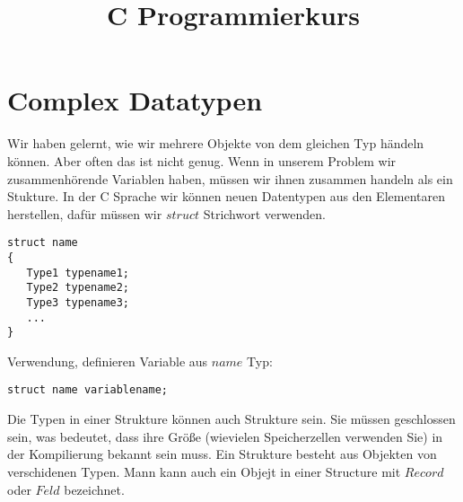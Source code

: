 \documentclass{article}[12pt]
\title{C Programmierkurs}
\newenvironment{myalertblock}[1]{%
    \tcolorbox[beamer,%
    noparskip,breakable,
    colback=White,colframe=Bittersweet,%
    colbacklower=Peach!75!White,%
    title=#1]}%
    {\endtcolorbox}
\begin{document}
\maketitle








\section{Complex Datatypen}
Wir haben gelernt, wie wir mehrere Objekte von dem gleichen Typ händeln
können. Aber often das ist nicht genug. Wenn in unserem Problem
wir zusammenhörende Variablen haben, müssen wir ihnen zusammen handeln
als ein Stukture. In der C Sprache wir können neuen Datentypen aus
den Elementaren herstellen, dafür müssen wir $struct$ Strichwort
verwenden.
\begin{myalertblock}{struct Typdefinierung}
\begin{lstlisting}
struct name
{
   Type1 typename1;
   Type2 typename2;
   Type3 typename3;
   ...
}
\end{lstlisting}
\vspace{-0.4cm}
Verwendung, definieren Variable aus $name$ Typ:
\begin{lstlisting}
struct name variablename;
\end{lstlisting}
\vspace{-0.4cm} 
Die Typen in einer Strukture können auch Strukture sein.
Sie müssen geschlossen sein, was bedeutet, dass ihre Größe
(wievielen Speicherzellen verwenden Sie) in der Kompilierung
bekannt sein muss.
\end{myalertblock}
Ein Strukture besteht aus Objekten von verschidenen Typen. 
Mann kann auch ein Objejt in einer Structure mit $Record$ 
oder $Feld$ bezeichnet.
\end{document}
